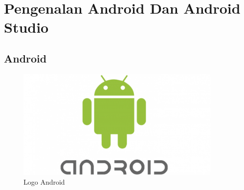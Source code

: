 \section{Pengenalan Android Dan Android Studio}
\subsection{Android}
 \begin{figure}[H]
    \centering
    \includegraphics[width=0.9\textwidth]{figures/android.png}
    \caption{Logo Android}
    \label{print}
    \end{figure}
    
